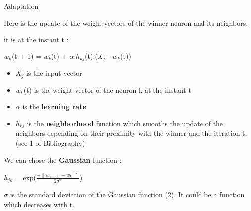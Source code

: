 \documentclass{beamer}
\begin{document}
	\begin{frame}{Adaptation}

Here is the update of the weight vectors of the winner neuron and its neighbors.

it is at the instant t : 

		\begin{center}

			$w_k$(t + 1) = $w_k$(t) + $\alpha$.$h_{kj}$(t).($X_j$ - $w_k$(t))	
		\end{center}

		\begin{itemize}
	
			\item $X_j$ is the input vector
			\item $w_k$(t) is the weight vector of the neuron k at the instant t
			\item $\alpha$ is the \textbf{learning rate}
			\item $h_{kj}$ is the \textbf{neighborhood} function which smooths the update of the neighbors depending on their proximity with the winner and the iteration t. (see 1 of Bibliography)
		\end{itemize}
	
We can chose the \textbf{Gaussian} function :

			\begin{center}
		
				$h_{jk}$ = exp($\frac{-\|w_{winner} - w_k\|^2}{2\sigma^2}$)
			\end{center}
		
$\sigma$ is the standard deviation of the Gaussian function (2). It could be a function which decreases with t.
	\end{frame}
\end{document}
